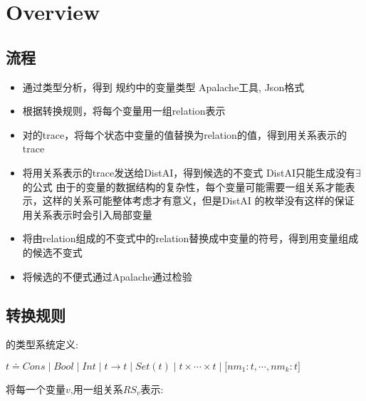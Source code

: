 
\section{Overview}  \label{section:overview}


\subsection{流程}\label{ss:invgen}

\begin{itemize}
  \item 通过类型分析，得到\tlaplus{} 规约中的变量类型
  \subitem Apalache工具, Json格式
  \item 根据转换规则，将每个变量用一组relation表示
  \item 对\tlaplus{}的trace，将每个状态中变量的值替换为relation的值，得到用关系表示的trace
  \item 将用关系表示的trace发送给DistAI，得到候选的不变式
  \subitem DistAI只能生成没有$\exists$的公式
  \subitem 由于\tlaplus{}的变量的数据结构的复杂性，每个变量可能需要一组关系才能表示，这样的关系可能整体考虑才有意义，但是DistAI
    的枚举没有这样的保证
  \subitem 用关系表示时会引入局部变量
  \item 将由relation组成的不变式中的relation替换成\tlaplus{}中变量的符号，得到用\tlaplus{}变量组成的候选不变式
  \item 将候选的不便式通过Apalache通过检验
\end{itemize}

\subsection{转换规则}\label{ss:transrule}


\tlaplus{} 的类型系统定义: 

$
  t \doteq Cons 
  \mid Bool 
  \mid Int 
  \mid t \rightarrow t 
  \mid Set(t) 
  \mid t\times\cdots\times t 
  \mid \lbrack nm_1:t,\cdots,nm_k:t\rbrack
$

将每一个变量$v$,用一组关系$RS_v$表示:

